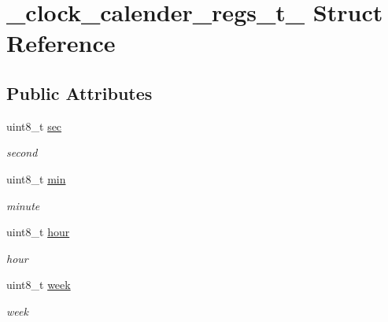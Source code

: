 \hypertarget{struct__clock__calender__regs__t__}{}\section{\+\_\+clock\+\_\+calender\+\_\+regs\+\_\+t\+\_\+ Struct Reference}
\label{struct__clock__calender__regs__t__}
\subsection*{Public Attributes}
\begin{DoxyCompactItemize}
\item 
\mbox{\label{struct__clock__calender__regs__t___a6bb30245c0827b985728d66a86ff4095}} 
uint8\+\_\+t \hyperlink{struct__clock__calender__regs__t___a6bb30245c0827b985728d66a86ff4095}{sec}
\begin{DoxyCompactList}\small\item\em second \end{DoxyCompactList}\item 
\mbox{\label{struct__clock__calender__regs__t___a6e625c254cfdc2aa5385cc3b310fe953}} 
uint8\+\_\+t \hyperlink{struct__clock__calender__regs__t___a6e625c254cfdc2aa5385cc3b310fe953}{min}
\begin{DoxyCompactList}\small\item\em minute \end{DoxyCompactList}\item 
\mbox{\label{struct__clock__calender__regs__t___aebfb0b527008db0870f14394ff39eaf8}} 
uint8\+\_\+t \hyperlink{struct__clock__calender__regs__t___aebfb0b527008db0870f14394ff39eaf8}{hour}
\begin{DoxyCompactList}\small\item\em hour \end{DoxyCompactList}\item 
\mbox{\label{struct__clock__calender__regs__t___af5b83b12718b8fbc0541ace542ab15e6}} 
uint8\+\_\+t \hyperlink{struct__clock__calender__regs__t___af5b83b12718b8fbc0541ace542ab15e6}{week}
\begin{DoxyCompactList}\small\item\em week \end{DoxyCompactList}\item 

\end{DoxyCompactItemize}
